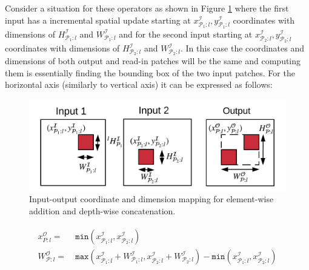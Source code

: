 Consider a situation for these operators as shown in Figure \ref{fig:la_operators} where the first input has a incremental spatial update starting at $x^\mathcal{I}_{\mathcal{P}_1:l},y^\mathcal{I}_{\mathcal{P}_1:l}$ coordinates with dimensions of $H^\mathcal{I}_{\mathcal{P}_1:l}$ and $W^\mathcal{I}_{\mathcal{P}_1:l}$ and for the second input starting at $x^\mathcal{I}_{\mathcal{P}_2:l},y^\mathcal{I}_{\mathcal{P}_2:l}$ coordinates with dimensions of $H^\mathcal{I}_{\mathcal{P}_2:l}$ and $W^\mathcal{I}_{\mathcal{P}_2:l}$.
In this case the coordinates and dimensions of both output and read-in patches will be the same and computing them is essentially finding the bounding box of the two input patches.
For the horizontal axis (similarly to vertical axis) it can be expressed as follows:

\begin{figure}[t]
\includegraphics[width=\columnwidth]{images/la_operators}
\caption{Input-output coordinate and dimension mapping for element-wise addition and depth-wise concatenation.}
\label{fig:la_operators}
\end{figure}

\begin{align}
\begin{split}
x^\mathcal{O}_{P:l} =&~ \texttt{min}(x^\mathcal{I}_{\mathcal{P}_1:l}, x^\mathcal{I}_{\mathcal{P}_2:l})\\
W^\mathcal{O}_{\mathcal{P}:l} =&~ \texttt{max}(x^\mathcal{I}_{\mathcal{P}_1:l}+W^\mathcal{I}_{\mathcal{P}_1:l},x^\mathcal{I}_{\mathcal{P}_2:l}+W^\mathcal{I}_{\mathcal{P}_2:l}) -\texttt{min}(x^\mathcal{I}_{\mathcal{P}_1:l},x^\mathcal{I}_{\mathcal{P}_2:l})
\end{split}
\end{align}

